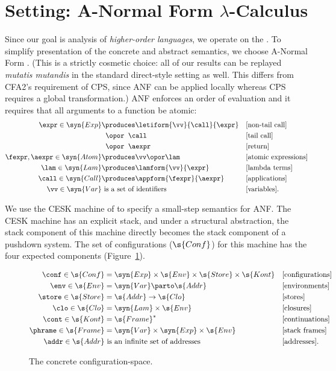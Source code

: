 \section{Setting: A-Normal Form 
$\lambda$-Calculus}
\label{sec:anf}

Since our goal is analysis of
\emph{higher-order languages}, we operate on the
\lc{}.
To simplify presentation of the concrete and abstract semantics, we choose 
A-Normal Form \lc{}.
(This is a strictly cosmetic
 choice: all of our results can be replayed \emph{mutatis mutandis} in
 the standard direct-style setting as well.
 This differs from CFA2's requirement of CPS, since ANF can be applied locally whereas CPS requires a global transformation.)
ANF enforces an order of evaluation and it requires
that all arguments to a function be atomic:
\begin{align*}
\expr \in \syn{Exp} &\produces \letiform{\vv}{\call}{\expr} && \text{[non-tail call]}
\\
&\;\;\opor\;\; \call && \text{[tail call]}
\\
&\;\;\opor\;\; \aexpr && \text{[return]}
\\
\fexpr,\aexpr \in \syn{Atom} &\produces \vv \opor \lam && \text{[atomic expressions]}
\\
\lam \in \syn{Lam} &\produces \lamform{\vv}{\expr} && \text{[lambda terms]}
\\
\call \in \syn{Call} &\produces \appform{\fexpr}{\aexpr} && \text{[applications]}
\\
\vv \in \syn{Var} &\text{ is a set of identifiers} && \text{[variables]}
\text.
\end{align*}




We use the CESK machine of \citet{mattmight:Felleisen:1987:CESK} to specify a small-step semantics
for ANF.
The CESK machine has an explicit stack, and under a structural abstraction, the stack
component of this machine directly becomes the stack component of a
pushdown system.
The set of configurations ($\s{Conf}$) for 
this machine has the four expected components (Figure~\ref{fig:cesk}).
\begin{figure}
\figrule
\begin{align*}
\conf \in \s{Conf} &= \syn{Exp} \times \s{Env} \times \s{Store} \times \s{Kont} && \text{[configurations]}
\\
\env \in \s{Env} &= \syn{Var} \parto \s{Addr} && \text{[environments]}
\\
\store \in \s{Store} &= \s{Addr} \to \s{Clo} && \text{[stores]}
\\
\clo \in \s{Clo} &= \syn{Lam} \times \s{Env} && \text{[closures]}
\\
\cont \in \s{Kont} &= \s{Frame}^* && \text{[continuations]}
\\
\phrame \in \s{Frame} &= \syn{Var} \times \syn{Exp} \times \s{Env}  && \text{[stack frames]}
\\
\addr \in \s{Addr} &\text{ is an infinite set of addresses} && \text{[addresses]}
\text.
\end{align*}
\captionsetup{justification=centering}
\caption{The concrete configuration-space.}
\label{fig:cesk}
\figrule
\end{figure}

